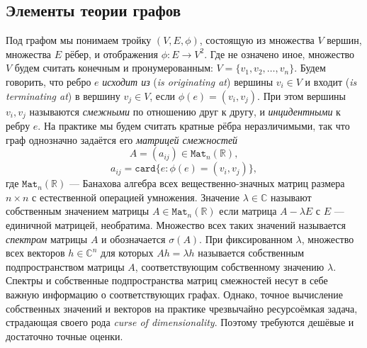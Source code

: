 \documentclass[14pt,a4paper]{extarticle}
\numberwithin{equation}{section}
\theoremstyle{definition}
\begin{document}
\subsection{Элементы теории графов}

Под графом мы понимаем тройку \((V, E, \phi)\), состоящую
из множества \( V \) вершин, множества \( E \) рёбер,
и отображения \( \phi: E\to V^2\). Где не означено иное,
множество \( V \) будем считать конечным и пронумерованным: \( V = \{ v_1, v_2,
\ldots, v_n \}\). 
Будем говорить, что ребро \( e \) \emph{исходит из} (\emph{is originating at})
вершины \( v_i\in V \)
и входит (\emph{is terminating at}) в вершину \( v_j\in V \),
если \( \phi(e)=(v_i, v_j)\). При этом вершины \( v_i, v_j \) называются
\emph{смежными} по отношению друг к другу, и \emph{инцидентными} к ребру \( e \).
На практике мы будем считать кратные рёбра неразличимыми,
так что граф однозначно задаётся его \emph{матрицей смежностей}
\[ A = ( a_{ij} ) \in \mathtt{Mat}_n(\mathbb{R}), \]
\[ a_{ij} = \mathtt{card}\{ e: \phi(e)=(v_i, v_j)\}, \]
где \( \mathtt{Mat}_n(\mathbb{R}) \) --- Банахова алгебра всех
вещественно-значных матриц размера
\( n{\times}n \) с естественной операцией умножения.
Значение \( \lambda \in \mathbb{C} \) называют собственным значением
матрицы \(
A\in\mathtt{Mat}_n(\mathbb{R}) \) если матрица \( A - \lambda E \) с \( E \) --- единичной
матрицей, необратима. Множество всех таких значений называется
\emph{спектром} матрицы \( A \) и обозначается \( \sigma(A) \).
При фиксированном \( \lambda \),  множество всех векторов \( h\in\mathbb{C}^n \)
для которых \( A h = \lambda h \) называется собственным подпространством матрицы
\( A \), соответствующим собственному значению \( \lambda \).
Спектры и собственные подпространства матриц смежностей несут в себе важную
информацию о соответствующих графах. Однако, точное вы\-числ\-ение собств\-енных
значений и век\-торов на практике чрез\-вычайно ресурсо\-ёмкая задача, страдающая
своего рода \emph{curse of dimensionality}. Поэтому требуются дешёвые и
дос\-таточно точные оценки.
\end{document}
